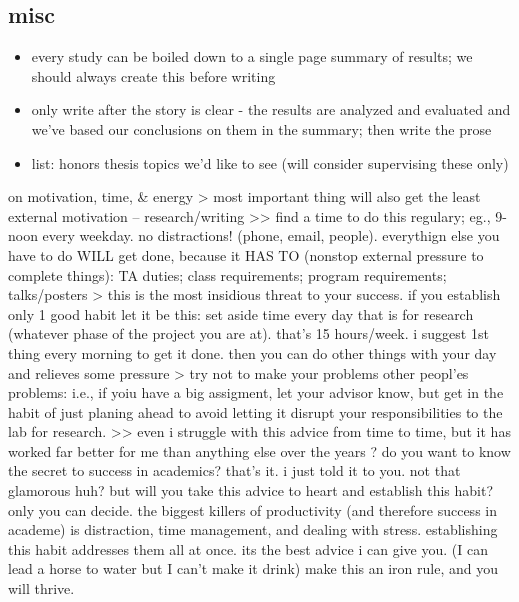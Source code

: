 \documentclass[
]{book}
\begin{document}
\hypertarget{misc}{%
\subsection{misc}\label{misc}}

\begin{itemize}
\item
  every study can be boiled down to a single page summary of results; we should always create this before writing
\item
  only write after the story is clear - the results are analyzed and evaluated and we've based our conclusions on them in the summary; then write the prose
\item
  list: honors thesis topics we'd like to see (will consider supervising these only)
\end{itemize}

on motivation, time, \& energy
\textgreater{} most important thing will also get the least external motivation -- research/writing
\textgreater\textgreater{} find a time to do this regulary; eg., 9-noon every weekday. no distractions! (phone, email, people).
everythign else you have to do WILL get done, because it HAS TO (nonstop external pressure to complete things): TA duties; class requirements; program requirements; talks/posters
\textgreater{} this is the most insidious threat to your success. if you establish only 1 good habit let it be this: set aside time every day that is for research (whatever phase of the project you are at). that's 15 hours/week. i suggest 1st thing every morning to get it done. then you can do other things with your day and relieves some pressure
\textgreater{} try not to make your problems other peopl'es problems: i.e., if yoiu have a big assigment, let your advisor know, but get in the habit of just planing ahead to avoid letting it disrupt your responsibilities to the lab for research.
\textgreater\textgreater{} even i struggle with this advice from time to time, but it has worked far better for me than anything else over the years
? do you want to know the secret to success in academics? that's it. i just told it to you. not that glamorous huh? but will you take this advice to heart and establish this habit? only you can decide. the biggest killers of productivity (and therefore success in academe) is distraction, time management, and dealing with stress. establishing this habit addresses them all at once. its the best advice i can give you. (I can lead a horse to water but I can't make it drink) make this an iron rule, and you will thrive.
\end{document}
